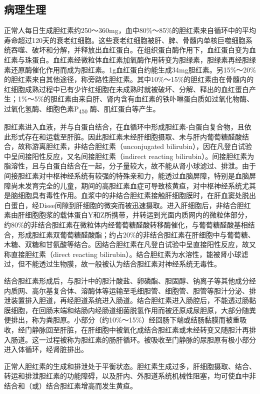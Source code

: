 \subsection{病理生理}

正常人每日生成胆红素约250～360mg，血中80\%～85\%的胆红素来自循环中的平均寿命超过120天的衰老红细胞。这些衰老红细胞被肝、脾、骨髓内单核巨噬细胞系统吞噬、破坏和分解，并释放出血红蛋白。在组织蛋白酶作用下，血红蛋白变为血红素与珠蛋白。血红素经微粒体血红素加氧酶作用转变为胆绿素，胆绿素再经胆绿素还原酶催化作用而成为胆红素。1g血红蛋白约能生成34mg胆红素。另15\%～20\%的胆红素来自其他途径，称旁路性胆红素。其中10\%～15\%的胆红素由在骨髓内的红细胞成熟过程中已有少许红细胞在未成熟时就被破坏、分解、释出的血红蛋白产生；1\%～5\%的胆红素由来自肝、肾内含有血红素的铁卟啉蛋白质如过氧化物酶、过氧化氢酶、细胞色素P\textsubscript{450}
酶、肌红蛋白等产生。

胆红素进入血液，并与白蛋白结合，在血循环中形成胆红素-白蛋白复合物，且依此形式存在和运载至肝脏。因此胆红素未经肝细胞摄取、未与肝内葡萄糖醛酸结合，故称游离胆红素，非结合胆红素（unconjugated
bilirubin），因在凡登白试验中呈间接阳性反应，又名间接胆红素（indirect
reacting
bilirubin）。间接胆红素为脂溶性，且与白蛋白结合在一起，分子量较大，故不能从肾小球滤过、排泄。由于间接胆红素对中枢神经系统有较强的特殊亲和力，能透过血脑屏障，特别是血脑屏障尚未发育完全的儿童，期间的高胆红素血症可导致核黄疸，对中枢神经系统尤其是脑细胞具有毒性作用。血浆中的非结合胆红素接触肝细胞膜时，在肝血窦处脱出白蛋白，经Disse间隙到肝细胞的微突而被迅速摄取。进入肝细胞后，非结合胆红素由肝细胞胞浆的载体蛋白Y和Z所携带，并转运到光面内质网内的微粒体部分，约80\%的非结合胆红素在微粒体内经葡萄糖醛酸转移酶催化，与葡萄糖醛酸基相结合，形成胆红素双葡萄糖醛酸酯；约占20\%的非结合胆红素在肝细胞中与葡萄糖、木糖、双糖和甘氨酸等结合。因结合胆红素在凡登白试验中呈直接阳性反应，故又称直接胆红素（direct
reacting
bilirubin）。结合胆红素为水溶性，能被肾小球滤过，但不能透过生物膜，故一般被认为结合胆红素对神经系统无毒性。

结合胆红素形成后，与胆汁中的胆汁酸盐、卵磷酯、胆固醇、钠离子等其他成分经内质网、高尔基复合体、溶酶体等运输至毛细胆管、细胞管、胆管等胆汁分泌、排泄装置排入胆道，再经胆道系统进入肠道。结合胆红素进入肠腔后，不能透过肠黏膜细胞，在回肠末端和结肠内经肠道细菌脱氢作用而被还原成尿胆原，大部分随粪便排出，称为粪胆原。小部分（约10\%～15\%）经回肠下端或结肠黏膜而被重吸收，经门静脉回至肝脏，在肝细胞中被氧化成结合胆红素或未经转变又随胆汁再排入肠道。这一过程被称为胆红素的肠肝循环。被吸收至门静脉的尿胆原有极小部分进入体循环，经肾脏排出。

正常人胆红素的生成和排泄处于平衡状态。胆红素生成过多，肝细胞摄取、结合、转运和排泄胆红素的功能障碍，以及肝内、外胆道系统机械性阻塞，均可使血中非结合和（或）结合胆红素增高而发生黄疸。

